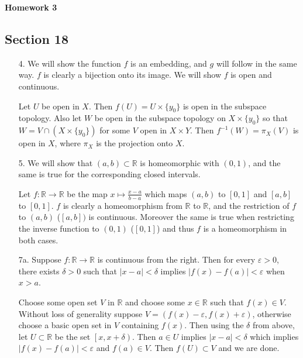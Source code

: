 \documentclass[11pt, reqno]{article}
\theoremstyle{plain}
\theoremstyle{definition}
\theoremstyle{remark}
\renewcommand{\epsilon}{\varepsilon}
\newcommand{\RR}{\mathbb{R}}
\begin{document}
\topmargin=-40pt
\renewcommand{\headrulewidth}{1pt}
\renewcommand{\headsep}{20pt}
\thispagestyle{fancy}

{\Huge \bfseries \noindent Homework 3}

\subsection*{Section 18}

\begin{enumerate}
    \item[4.] We will show the function $f$ is an embedding, and $g$ will follow in the same way. 
    $f$ is clearly a bijection onto its image. We will show $f$ is open and continuous. 

    Let $U$ be open in $X$. Then $f(U) = U \times \{y_0\}$ is open in the subspace topology. Also 
    let $W$ be open in the subspace topology on $X \times \{y_0\}$ so that $W = V \cap (X \times \{y_0\})$
    for some $V$ open in $X \times Y$. Then $f^{-1}(W) = \pi_X(V)$ is open in $X$, where $\pi_X$ is the 
    projection onto $X$. 

    \item[5.] We will show that $(a,b) \subset \RR$ is homeomorphic with $(0,1)$, and the same is true 
    for the corresponding closed intervals. 

    Let $f: \RR \rightarrow \RR$ be the map $x \mapsto \frac{x-a}{b-a}$ which maps $(a,b)$ to $[0,1]$ 
    and $[a,b]$ to $[0,1]$.
    $f$ is clearly a homeomorphism 
    from $\RR$ to $\RR$, and the restriction of $f$ to $(a,b)$ ($[a,b])$ is continuous. Moreover the
    same is true when restricting the inverse function to $(0,1)$ ($[0,1]$) and thus $f$ is a homeomorphism
    in both cases.

    \item[7a.] Suppose $f: \RR \rightarrow \RR$ is continuous from the right. Then for every $\epsilon > 0$,
    there exists $\delta > 0$ such that $|x - a| < \delta$ implies $|f(x) - f(a)| < \epsilon$ when $x > a$.

    Choose some open set $V$ in $\RR$ and choose some $x \in \RR$ such that $f(x) \in V$. Without loss of 
    generality suppose $V = (f(x) - \epsilon, f(x) + \epsilon)$, otherwise choose a basic open set
    in $V$ containing $f(x)$. Then using the $\delta$ from above, let $U \subset \RR$ be the set $\left[x, x + \delta\right)$.
    Then $a \in U$ implies $|x - a| < \delta$ which implies $|f(x) - f(a)| < \epsilon$ and $f(a) \in V$. 
    Then $f(U) \subset V$ and we are done. 


\end{enumerate}
\end{document}
